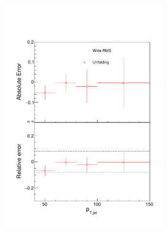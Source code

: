 \begin{figure}
\centering
\begin{subfigure}{0.24\textwidth}
\includegraphics[width=0.95\textwidth]{results/SystematicErrors/SystematicErrorsGammaRMS_UnfNFin00JetPt08_linx_data}
\end{subfigure}
\begin{subfigure}{0.24\textwidth}

\end{subfigure}
\end{figure}

